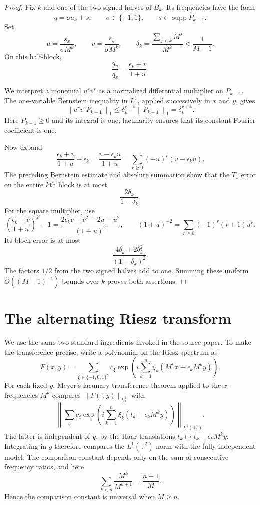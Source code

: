 \documentclass[11pt]{article}
\newcommand{\norm}[1]{\left\lVert #1\right\rVert}
\begin{document}
\begin{proof}
Fix $k$ and one of the two signed halves of $B_k$.  Its frequencies have the
form
\[
 q=\sigma a_k+s,\qquad \sigma\in\{-1,1\},
 \qquad s\in\operatorname{supp}\widehat P_{k-1}.
\]
Set
\[
 u=\frac{s_x}{\sigma M^k},\qquad
 v=\frac{s_y}{\sigma M^k},\qquad
 \delta_k=\frac{\sum_{j<k}M^j}{M^k}<\frac1{M-1}.
\]
On this half-block,
\[
                 \frac{q_y}{q_x}=\frac{\epsilon_k+v}{1+u}.
\]

We interpret a monomial $u^rv^s$ as a normalized differential multiplier on
$P_{k-1}$.  The one-variable Bernstein inequality in $L^1$, applied
successively in $x$ and $y$, gives
\[
 \norm{u^rv^sP_{k-1}}_1
 \le \delta_k^{r+s}\norm{P_{k-1}}_1
 =\delta_k^{r+s}.
\]
Here $P_{k-1}\ge0$ and its integral is one; lacunarity ensures that its
constant Fourier coefficient is one.

Now expand
\[
 \frac{\epsilon_k+v}{1+u}-\epsilon_k
   =\frac{v-\epsilon_ku}{1+u}
   =\sum_{r\ge0}(-u)^r(v-\epsilon_ku).
\]
The preceding Bernstein estimate and absolute summation show that the
$T_1$ error on the entire $k$th block is at most
\[
                   \frac{2\delta_k}{1-\delta_k}.
\]
For the square multiplier, use
\[
 \left(\frac{\epsilon_k+v}{1+u}\right)^2-1
 =\frac{2\epsilon_kv+v^2-2u-u^2}{(1+u)^2},
 \qquad
 (1+u)^{-2}=\sum_{r\ge0}(-1)^r(r+1)u^r.
\]
Its block error is at most
\[
                  \frac{4\delta_k+2\delta_k^2}{(1-\delta_k)^2}.
\]
The factors $1/2$ from the two signed halves add to one.  Summing these
uniform $O((M-1)^{-1})$ bounds over $k$ proves both assertions.
\end{proof}

\section{The alternating Riesz transform}

We use the same two standard ingredients invoked in the source paper.  To make
the transference precise, write a polynomial on the Riesz spectrum as
\[
 F(x,y)=\sum_{\xi\in\{-1,0,1\}^n}c_\xi
 \exp\!\left(i\sum_{k=1}^n\xi_k(M^kx+\epsilon_kM^ky)\right).
\]
For each fixed $y$, Meyer's lacunary transference theorem applied to the
$x$-frequencies $M^k$ compares $\|F(\cdot,y)\|_{L^1_x}$ with
\[
 \left\|\sum_\xi c_\xi
 \exp\!\left(i\sum_{k=1}^n\xi_k(t_k+\epsilon_kM^ky)\right)
 \right\|_{L^1(\mathbb T^n_t)}.
\]
The latter is independent of $y$, by the Haar translations
$t_k\mapsto t_k-\epsilon_kM^ky$.  Integrating in $y$ therefore compares the
$L^1(\mathbb T^2)$ norm with the fully independent model.  The comparison
constant depends only on the sum of consecutive frequency ratios, and here
\[
 \sum_{k<n}\frac{M^k}{M^{k+1}}=\frac{n-1}{M}.
\]
Hence the comparison constant is universal when $M\ge n$.
\end{document}
